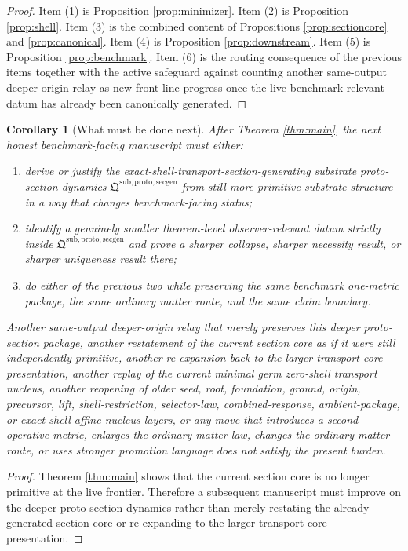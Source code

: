 \documentclass[11pt]{article}
\newcommand{\ProtoSectionPackage}{\mathfrak Q^{\mathrm{sub,proto,secgen}}}
\newtheorem{corollary}{Corollary}
\begin{document}
\begin{proof}
Item (1) is Proposition \ref{prop:minimizer}. Item (2) is Proposition \ref{prop:shell}. Item (3) is the combined content of Propositions \ref{prop:sectioncore} and \ref{prop:canonical}. Item (4) is Proposition \ref{prop:downstream}. Item (5) is Proposition \ref{prop:benchmark}. Item (6) is the routing consequence of the previous items together with the active safeguard against counting another same-output deeper-origin relay as new front-line progress once the live benchmark-relevant datum has already been canonically generated.
\end{proof}

\begin{corollary}[What must be done next]
\label{cor:next}
After Theorem \ref{thm:main}, the next honest benchmark-facing manuscript must either:
\begin{enumerate}
    \item derive or justify the exact-shell-transport-section-generating substrate proto-section dynamics \(\ProtoSectionPackage\) from still more primitive substrate structure in a way that changes benchmark-facing status;
    \item identify a genuinely smaller theorem-level observer-relevant datum strictly inside \(\ProtoSectionPackage\) and prove a sharper collapse, sharper necessity result, or sharper uniqueness result there;
    \item do either of the previous two while preserving the same benchmark one-metric package, the same ordinary matter route, and the same claim boundary.
\end{enumerate}
Another same-output deeper-origin relay that merely preserves this deeper proto-section package, another restatement of the current section core as if it were still independently primitive, another re-expansion back to the larger transport-core presentation, another replay of the current minimal germ zero-shell transport nucleus, another reopening of older seed, root, foundation, ground, origin, precursor, lift, shell-restriction, selector-law, combined-response, ambient-package, or exact-shell-affine-nucleus layers, or any move that introduces a second operative metric, enlarges the ordinary matter law, changes the ordinary matter route, or uses stronger promotion language does not satisfy the present burden.
\end{corollary}

\begin{proof}
Theorem \ref{thm:main} shows that the current section core is no longer primitive at the live frontier. Therefore a subsequent manuscript must improve on the deeper proto-section dynamics rather than merely restating the already-generated section core or re-expanding to the larger transport-core presentation.
\end{proof}
\end{document}

